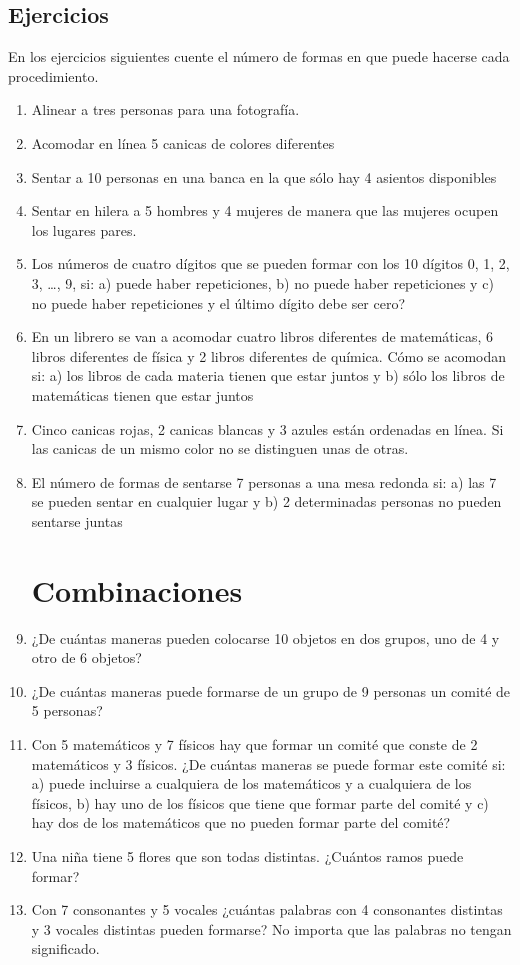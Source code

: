 \documentclass[10pt,twoside]{article}
\begin{document}
\subsection*{Ejercicios}
En los ejercicios siguientes cuente el número de formas en que puede hacerse cada procedimiento.
\begin{enumerate}
\item Alinear a tres personas para una fotografía.
\item Acomodar en línea 5 canicas de colores diferentes
\item Sentar a 10 personas en una banca en la que sólo hay 4 asientos disponibles
\item Sentar en hilera a 5 hombres y 4 mujeres de manera que las mujeres ocupen los lugares pares.
\item Los números de cuatro dígitos que se pueden formar con los 10 dígitos 0, 1, 2, 3, \ldots , 9, si: a) puede haber
repeticiones, b) no puede haber repeticiones y c) no puede haber repeticiones y el último dígito debe ser cero?
\item En un librero se van a acomodar cuatro libros diferentes de matemáticas, 6 libros diferentes de física y 2 libros diferentes de química. Cómo se acomodan si: a) los libros de cada materia tienen que estar juntos y b) sólo los libros de matemáticas tienen que estar juntos
\item Cinco canicas rojas, 2 canicas blancas y 3 azules están ordenadas en línea. Si las canicas de un mismo color no se distinguen unas de otras.
\item El número de formas de sentarse 7 personas a una mesa redonda si: a) las 7 se pueden sentar en cualquier lugar y b) 2 determinadas personas no pueden sentarse juntas
\section*{Combinaciones}
\item ¿De cuántas maneras pueden colocarse 10 objetos en dos grupos, uno de 4 y otro de 6 objetos?
\item ¿De cuántas maneras puede formarse de un grupo de 9 personas un comité de 5 personas?
\item Con 5 matemáticos y 7 físicos hay que formar un comité que conste de 2 matemáticos y 3 físicos. ¿De cuántas maneras se puede formar este comité si: a) puede incluirse a cualquiera de los matemáticos y a cualquiera de los físicos, b) hay uno de los físicos que tiene que formar parte del comité y c) hay dos de los matemáticos que no pueden formar parte del comité?
\item Una niña tiene 5 flores que son todas distintas. ¿Cuántos ramos puede formar?
\item Con 7 consonantes y 5 vocales ¿cuántas palabras con 4 consonantes distintas y 3 vocales distintas pueden formarse? No importa que las palabras no tengan significado.

\end{enumerate}
\end{document}

